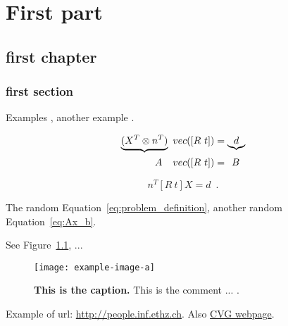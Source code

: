 \documentclass[a5paper,twoside,headsepline,pagesize,10pt,DIV=12]{scrbook}
\begin{document}
    


\frontmatter

    
    
    


\mainmatter

\part{First part}
\chapter{first chapter}
    \newpage\ChapFrame

    \section{first section}
    Examples \cite{kneip2013, kneip2014openGV}, another example \cite{asa, camposeco2018}.

    \begin{align}
        \underbrace{(X^T\otimes n^T)} \,\, vec([R ~ t]) &= \underbrace{d} \\
        A \hspace*{2.5ex} vec([R ~ t]) &= \hspace*{1ex} B
        \label{eq:Ax_b}
    \end{align}

    \begin{equation}
    n^T [R~t] X = d \enspace .
    \label{eq:problem_definition}
    \end{equation}

    The random Equation~\eqref{eq:problem_definition}, another random Equation~\eqref{eq:Ax_b}.

    See Figure~\ref{fig:figer}, ...
    \begin{figure}[!h]
        \centering
        \texttt{[image: example-image-a]}
        \caption{\textbf{This is the caption.} This is the comment ... .}
        \label{fig:figer}
    \end{figure}

    Example of url: {\small\url{http://people.inf.ethz.ch}}. Also \href{http://people.inf.ethz.ch}{CVG webpage}.
    \lipsum[1-10]
\end{document}

